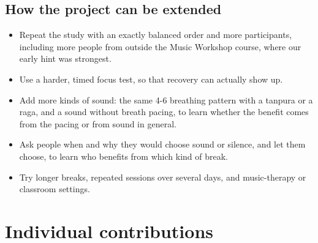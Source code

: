 \documentclass[11pt,a4paper]{article}
\begin{document}
\subsection*{How the project can be extended}

\begin{itemize}
\item Repeat the study with an exactly balanced order and more participants, including more people from outside the Music Workshop course, where our early hint was strongest.
\item Use a harder, timed focus test, so that recovery can actually show up.
\item Add more kinds of sound: the same 4-6 breathing pattern with a tanpura or a raga, and a sound without breath pacing, to learn whether the benefit comes from the pacing or from sound in general.
\item Ask people when and why they would choose sound or silence, and let them choose, to learn who benefits from which kind of break.
\item Try longer breaks, repeated sessions over several days, and music-therapy or classroom settings.
\end{itemize}

\section{Individual contributions}
\end{document}
